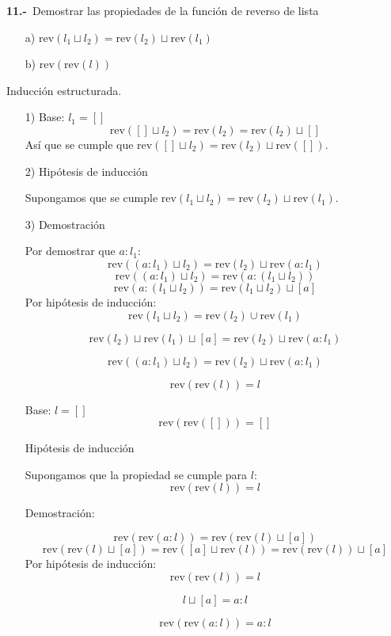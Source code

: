 \textbf{11.-}\ Demostrar las propiedades de la función de reverso de lista


\begin{itemize}
    \item[a)] $\text{rev}(l_1 \sqcup l_2) = \text{rev}(l_2) \sqcup \text{rev}(l_1)$
    \item[b)] $\text{rev}(\text{rev}(l))$
\end{itemize}

Inducción estructurada.

\begin{enumerate}
    \item[1)] Base: $l_1 = []$
    \[
    \text{rev}([] \sqcup l_2) = \text{rev}(l_2) = \text{rev}(l_2) \sqcup []
    \]
    Así que se cumple que $\text{rev}([] \sqcup l_2) = \text{rev}(l_2) \sqcup \text{rev}([])$.

    \item[2)] Hipótesis de inducción

    Supongamos que se cumple $\text{rev}(l_1 \sqcup l_2) = \text{rev}(l_2) \sqcup \text{rev}(l_1)$.

    \item[3)] Demostración

    Por demostrar que $a : l_1$:
    \[
    \text{rev}((a : l_1) \sqcup l_2) = \text{rev}(l_2) \sqcup \text{rev}(a : l_1)
    \]
    \[
    \text{rev}((a : l_1) \sqcup l_2) = \text{rev}(a : (l_1 \sqcup l_2))
    \]
    \[
    \text{rev}(a : (l_1 \sqcup l_2)) = \text{rev}(l_1 \sqcup l_2) \sqcup [a]
    \]
    Por hipótesis de inducción:
    \[
    \text{rev}(l_1 \sqcup l_2) = \text{rev}(l_2) \cup \text{rev}(l_1)
    \]

    \[
    \text{rev}(l_2) \sqcup \text{rev}(l_1) \sqcup [a] = \text{rev}(l_2) \sqcup \text{rev}(a : l_1)
    \]
    
    \[
    \text{rev}((a : l_1) \sqcup l_2) = \text{rev}(l_2) \sqcup \text{rev}(a : l_1)
    \]

    \[
    \text{rev}(\text{rev}(l)) = l
    \]
    \item[Base:] $l = []$
    \[
    \text{rev}(\text{rev}([])) = []
    \]

    \item[Hipótesis de inducción]

    Supongamos que la propiedad se cumple para $l$:
    \[
    \text{rev}(\text{rev}(l)) = l
    \]

    \item[Demostración:]

    \[
    \text{rev}(\text{rev}(a : l)) = \text{rev}(\text{rev}(l) \sqcup [a])
    \]
    \[
    \text{rev}(\text{rev}(l) \sqcup [a]) = \text{rev}([a] \sqcup \text{rev}(l)) = \text{rev}(\text{rev}(l)) \sqcup [a]
    \]
    Por hipótesis de inducción:
    \[
    \text{rev}(\text{rev}(l)) = l
    \]

    \[
    l \sqcup [a] = a : l
    \]

    \[
    \text{rev}(\text{rev}(a : l)) = a : l
    \]
\end{enumerate}

